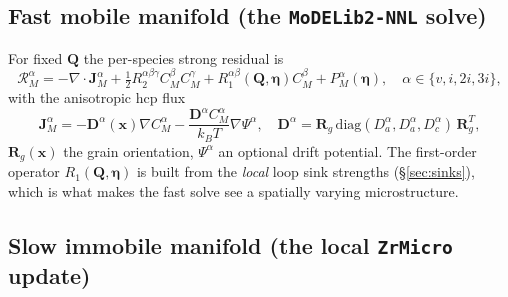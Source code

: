 \documentclass[11pt]{article}
\newcommand{\grad}{\nabla}
\newcommand{\Div}{\nabla\cdot}
\newcommand{\kb}{k_{B}}
\newcommand{\ZrMicro}{\texttt{ZrMicro}}
\newcommand{\MoDELib}{\texttt{MoDELib2-NNL}}
\begin{document}
\subsection{Fast mobile manifold (the \MoDELib{} solve)}

For fixed $\mathbf Q$ the per-species strong residual is
\begin{equation}
\label{eq:mobile_residual}
    \mathcal{R}_{M}^{\alpha}
    =
    -\Div\mathbf{J}_{M}^{\alpha}
    + \tfrac{1}{2}R_{2}^{\alpha\beta\gamma}C_{M}^{\beta}C_{M}^{\gamma}
    + R_{1}^{\alpha\beta}(\mathbf{Q},\bm{\eta})C_{M}^{\beta}
    + P_{M}^{\alpha}(\bm{\eta}),
    \quad \alpha\in\{v,i,2i,3i\},
\end{equation}
with the anisotropic hcp flux
\begin{equation}
\label{eq:mobile_flux}
    \mathbf{J}_{M}^{\alpha}
    =
    -\mathbf{D}^{\alpha}(\mathbf x)\grad C_{M}^{\alpha}
    -\frac{\mathbf{D}^{\alpha}C_{M}^{\alpha}}{\kb T}\grad\Psi^{\alpha},
    \quad
    \mathbf{D}^{\alpha}
    =
    \mathbf{R}_{g}\,\mathrm{diag}(D_a^\alpha,D_a^\alpha,D_c^\alpha)\,\mathbf{R}_{g}^{T},
\end{equation}
$\mathbf R_g(\mathbf x)$ the grain orientation, $\Psi^\alpha$ an optional drift
potential. The first-order operator $R_1(\mathbf Q,\bm\eta)$ is built from the
\emph{local} loop sink strengths (\S\ref{sec:sinks}), which is what makes the fast
solve see a spatially varying microstructure.

\subsection{Slow immobile manifold (the local \ZrMicro{} update)}
\label{sec:slow_eqs}
\end{document}
